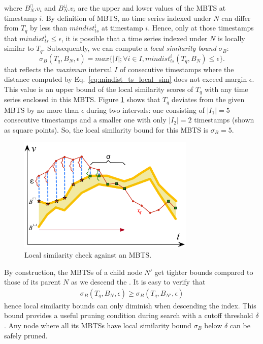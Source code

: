 \noindent where $B_{N}^{\sqcap}.v_i$ and $B_{N}^{\sqcup}.v_i$ are the upper and lower values of the MBTS at timestamp $i$. By definition of MBTS, no time series indexed under $N$ can differ from $T_q$ by less than $mindist_{ts}^i$ at timestamp $i$. Hence, only at those timestamps that $mindist_{ts}^i \leq \epsilon$, it is possible that a time series indexed under $N$ is locally similar to $T_q$. Subsequently, we can compute a {\em local similarity bound} $\sigma_B$:
\begin{equation}
\sigma_{B}(T_q, B_N, \epsilon) = max\{|I|; \forall i \in I, mindist^i_{ts}(T_q, B_N) \leq \epsilon\}.
\label{eq:sim_bound}
\end{equation}
\noindent that reflects the {\em maximum} interval $I$ of consecutive timestamps where the distance computed by Eq.~\ref{eq:mindist_ts_local_sim} does not exceed margin $\epsilon$. 
This value is an upper bound of the local similarity scores of $T_q$ with any time series enclosed in this MBTS. Figure \ref{fig:sim_mbts} shows that $T_q$ deviates from the given MBTS by no more than $\epsilon$ during two intervals: one consisting of $|I_1|=5$ consecutive timestamps and a smaller one with only $|I_2|=2$ timestamps (shown as square points). So, the local similarity bound for this MBTS is $\sigma_{B}=5$.

\begin{figure}[tb]
    \centering
    \includegraphics[width=0.75\textwidth]{Figures/sim_mbts.png}
    \caption{Local similarity check against an MBTS.}
    \label{fig:sim_mbts}
\end{figure}

By construction, the MBTSs of a child node $N'$ get tighter bounds compared to those of its parent $N$ as we descend the \btsr. It is easy to verify that 
\begin{equation}
\begin{split}
\sigma_{B}(T_q, B_N, \epsilon) \geq \sigma_{B}(T_q, B_{N'}, \epsilon)
\end{split}
\label{eq:maxdur_ts}
\end{equation}
\noindent hence local similarity bounds can only diminish when descending the index. This bound provides a useful pruning condition during search with a cutoff threshold $\delta$. Any node where all its MBTSs have local similarity bound $\sigma_{B}$ below $\delta$ can be safely pruned.

